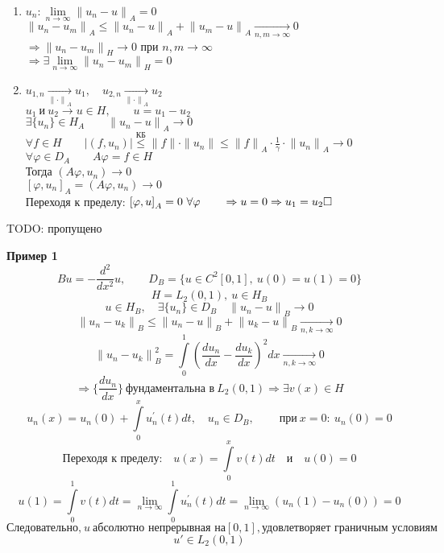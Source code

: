 \documentclass[12pt, a4paper]{article}
\begin{document}
\begin{enumerate}
	\item
	$ {u_n}: \lim\limits_{n \rightarrow \infty} {\|u_n - u\|}_A = 0 $ \\
	$ {\|u_n - u_m\|}_A \leq {\|u_n - u\|}_A + {\|u_m - u\|}_A \underset{n,m \rightarrow \infty}{\rightarrow} 0 $ \\
	$ \Rightarrow {\|u_n - u_m\|}_H \rightarrow 0 $ при $ n,m \rightarrow \infty $ \\
	$ \Rightarrow \exists \lim\limits_{n \rightarrow \infty} {\|u_n - u_m\|}_H = 0 $

	\item
	$ u_{1, n} \underset{{\|\cdot\|}_A}{\rightarrow}  u_1, \quad u_{2, n} \underset{{\|\cdot\|}_A}{\rightarrow}  u_2 $ \\
	$ u_1 \ \text{и} \ u_2 \rightarrow u \in H, \qquad u = u_1 - u_2$ \\
	$ \exists \{u_n\} \in H_A \qquad {\|u_n - u\|}_A \rightarrow 0 $ \\
	$ \forall f \in H \qquad |(f, u_n)| \overset{\text{КБ}}{\leq} \|f\|\cdot\|u_n\| \leq {\|f\|}_A\cdot\frac{1}{\gamma}\cdot{\|u_n\|}_A \rightarrow 0 $ \\
	$ \forall \varphi \in D_A \qquad A\varphi = f \in H $ \\
	Тогда $ (A\varphi, u_n) \rightarrow 0 $ \\
	$ {[\varphi, u_n]}_A = (A\varphi, u_n) \rightarrow 0 $ \\
	Переходя к пределу: $ {[\varphi, u]}_A = 0 \ \forall \varphi \qquad \Rightarrow u = 0 \Rightarrow u_1 = u_2 \hfill \square $
\end{enumerate}

TODO: пропущено

\textbf{Пример 1}
\[ Bu = - \frac{d^2}{d x^2}u, \qquad D_{B} = \{u \in C^2 [0,1], \ u(0) = u(1) = 0 \} \]
\[ H = L_2 (0, 1), \ u \in H_B \]
\[ u \in H_B, \quad \exists \{u_n\} \in D_B \quad {\|u_n - u\|}_B \rightarrow 0 \]
\[ {\|u_n - u_k\|}_B \leq {\|u_n - u\|}_B + {\|u_k - u\|}_B \underset{n,k \rightarrow \infty}{\rightarrow} 0 \]
\[ {\|u_n - u_k\|}_B^2 = \int\limits_{0}^{1} {\left(\frac{du_n}{dx} - \frac{du_k}{dx} \right)}^2 dx \underset{n,k \rightarrow \infty}{\rightarrow} 0 \]
\[ \Rightarrow \{\frac{du_n}{dx}\} \ \text{фундаментальна в} \ L_2(0,1) \Rightarrow \exists v(x) \in H\]
\[ u_n(x) = u_n(0) + \int\limits_{0}^{x} u_n^{'}(t) dt, \quad u_n \in D_B, \qquad \ \text{при} \ x=0:\ u_n(0) = 0 \]
\[ \text{Переходя к пределу:} \quad u(x) = \int\limits_{0}^{x} v(t) dt \quad \text{и} \quad u(0)=0\]
\[ u(1) = \int\limits_{0}^{1} v(t) dt = \lim\limits_{n \rightarrow \infty} \int\limits_{0}^{1} u_n^{'}(t) dt = \lim\limits_{n \rightarrow \infty} \left( u_n(1) - u_n(0) \right) = 0 \]
\[ \text{Следовательно,} \ u \ \text{абсолютно непрерывная на} [0,1], \text{удовлетворяет граничным условиям}\]
\[ u' \in L_2(0,1) \]
\end{document}
